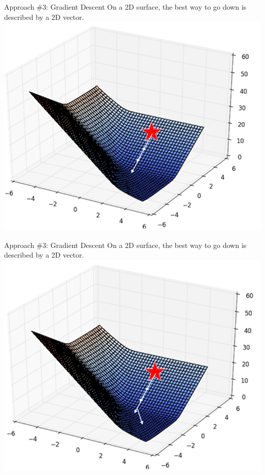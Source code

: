 \documentclass[aspectratio=169]{../latex_main/tntbeamer}  %
\begin{document}
	\begin{frame}{Approach \#3: Gradient Descent}
	    On a 2D surface, the best way to go down is described by a 2D vector.\\
	    \centering
	    \includegraphics[scale=.4]{Bild21}
	\end{frame}
	
	
	\begin{frame}{Approach \#3: Gradient Descent}
	    On a 2D surface, the best way to go down is described by a 2D vector.\\
	    \centering
	    \includegraphics[scale=.4]{Bild22}
	\end{frame}
	
\end{document}
